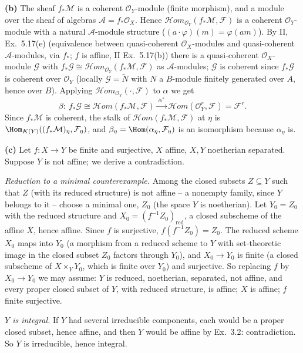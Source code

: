 \documentclass[11pt]{article}
\begin{document}
\textbf{(b)} The sheaf $f_*\mathcal M$ is a coherent $\mathcal O_Y$-module (finite morphism), and a module over the sheaf of algebras $\mathcal A=f_*\mathcal O_X$. Hence $\mathcal Hom_{\mathcal O_Y}(f_*\mathcal M,\mathcal F)$ is a coherent $\mathcal O_Y$-module with a natural $\mathcal A$-module structure ($(a\cdot\varphi)(m)=\varphi(am)$). By II, Ex.~5.17(e) (equivalence between quasi-coherent $\mathcal O_X$-modules and quasi-coherent $\mathcal A$-modules, via $f_*$; $f$ is affine, II Ex.~5.17(b)) there is a quasi-coherent $\mathcal O_X$-module $\mathcal G$ with $f_*\mathcal G\cong\mathcal Hom_{\mathcal O_Y}(f_*\mathcal M,\mathcal F)$ as $\mathcal A$-modules; $\mathcal G$ is coherent since $f_*\mathcal G$ is coherent over $\mathcal O_Y$ (locally $\mathcal G=\widetilde N$ with $N$ a $B$-module finitely generated over $A$, hence over $B$). Applying $\mathcal Hom_{\mathcal O_Y}(\cdot,\mathcal F)$ to $\alpha$ we get
\[
\beta:\ f_*\mathcal G\cong\mathcal Hom(f_*\mathcal M,\mathcal F)\xrightarrow{\ \alpha^*\ }\mathcal Hom(\mathcal O_Y^r,\mathcal F)=\mathcal F^r .
\]
Since $f_*\mathcal M$ is coherent, the stalk of $\mathcal Hom(f_*\mathcal M,\mathcal F)$ at $\eta$ is $\Hom_{K(Y)}((f_*\mathcal M)_\eta,\mathcal F_\eta)$, and $\beta_\eta=\Hom(\alpha_\eta,\mathcal F_\eta)$ is an isomorphism because $\alpha_\eta$ is.

\textbf{(c)} Let $f:X\to Y$ be finite and surjective, $X$ affine, $X,Y$ noetherian separated. Suppose $Y$ is not affine; we derive a contradiction.

\emph{Reduction to a minimal counterexample.} Among the closed subsets $Z\subseteq Y$ such that $Z$ (with its reduced structure) is not affine -- a nonempty family, since $Y$ belongs to it -- choose a minimal one, $Z_0$ (the space $Y$ is noetherian). Let $Y_0=Z_0$ with the reduced structure and $X_0=(f^{-1}Z_0)_{\mathrm{red}}$, a closed subscheme of the affine $X$, hence affine. Since $f$ is surjective, $f(f^{-1}Z_0)=Z_0$. The reduced scheme $X_0$ maps into $Y_0$ (a morphism from a reduced scheme to $Y$ with set-theoretic image in the closed subset $Z_0$ factors through $Y_0$), and $X_0\to Y_0$ is finite (a closed subscheme of $X\times_YY_0$, which is finite over $Y_0$) and surjective. So replacing $f$ by $X_0\to Y_0$ we may assume: $Y$ is reduced, noetherian, separated, not affine, and every proper closed subset of $Y$, with reduced structure, is affine; $X$ is affine; $f$ finite surjective.

\emph{$Y$ is integral.} If $Y$ had several irreducible components, each would be a proper closed subset, hence affine, and then $Y$ would be affine by Ex.~3.2: contradiction. So $Y$ is irreducible, hence integral.
\end{document}
